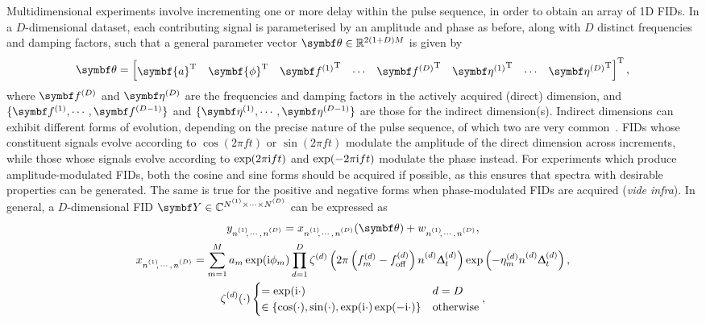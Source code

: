 Multidimensional experiments involve incrementing one or more delay within the
pulse sequence, in order to obtain an array of \ac{1D} \acp{FID}. In a
$D$-dimensional dataset, each contributing signal is parameterised by an
amplitude and phase as before, along with $D$ distinct frequencies and damping
factors, such that a general parameter vector  $\bth \in \mathbb{R}^{2(1+D)M}$
is given by
\begin{equation}
    \bth =
    \begin{bmatrix}
    \symbf{a}\T &
    \symbf{\phi}\T &
    {\bdfone}\T &
    \cdots &
    {\bdfD}\T &
    {\bdetaone}\T &
    \cdots &
    {\bdetaD}\T
    \end{bmatrix}\T,
    \label{eq:theta}
\end{equation}
where $\bdfD$ and $\bdetaD$ are the frequencies and damping factors in the
actively acquired (direct) dimension, and $\lbrace \bdfone, \cdots,
\bdfDminusone \rbrace$ and
$\lbrace \bdetaone, \cdots, \bdetaDminusone \rbrace$ are those for the indirect
dimension(s).
Indirect dimensions can exhibit different forms of evolution, depending on
the precise nature of the pulse sequence, of which two are very
common~\cite[Section 4.3.4]{Cavanagh2007}. \acp{FID} whose constituent signals
evolve according to $\cos(2 \pi f t)$ or $\sin(2 \pi f t)$ modulate the
amplitude of the direct dimension across increments, while those whose signals
evolve according to $\exp(2 \pi \mathrm{i} f t)$ and $\exp(-2 \pi \mathrm{i} f t)$ modulate
the phase instead.
For experiments which produce amplitude-modulated \acp{FID},
both the cosine and sine forms should be acquired if possible, as this ensures
that spectra with desirable properties can be generated. The same is true for the positive
and negative forms when phase-modulated \acp{FID} are acquired (\emph{vide
infra}). In general, a $D$-dimensional \ac{FID} $\bY \in \mathbb{C}^{\None
\times \cdots \times \ND}$ can be expressed as
\begin{subequations}
    \begin{gather}
        \ynonenD = \xnonenD(\bth) + \wnonenD,\\
        \xnonenD
            = \sumM \amexpphim \prodD
            \zeta^{(d)}\left(2 \pi \left(f^{(d)}_m  - \foffd\right) \nd \Dtd\right)
            \exp\left(-\eta^{(d)}_m \nd \Dtd\right),\\
        \zeta^{(d)}(\cdot)
        \begin{cases}
            = \exp(\iu\cdot) & d = D \\
            \in \left\lbrace \cos(\cdot), \sin(\cdot), \exp(\iu\cdot) \exp(-\iu\cdot)\right\rbrace & \text{otherwise}
        \end{cases},
    \end{gather}
    \label{eq:general-fid}%
\end{subequations}%

